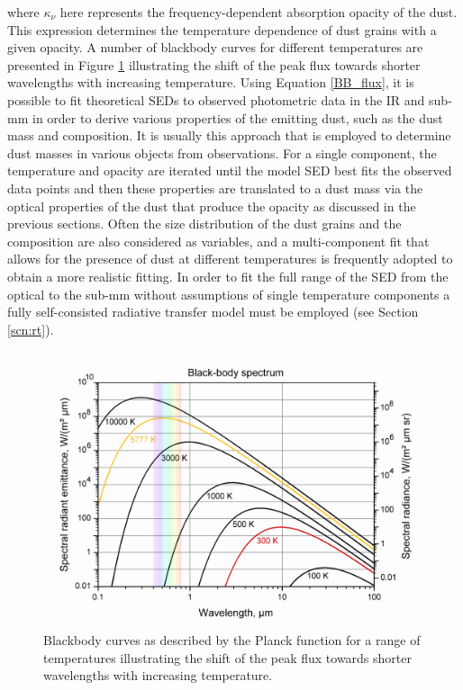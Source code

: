 \noindent where $\kappa_{\nu}$ here represents the frequency-dependent absorption opacity of the dust.  This expression determines the temperature dependence of dust grains with a given opacity.  A number of blackbody curves for different temperatures are presented in Figure \ref{BB} illustrating the shift of the peak flux towards shorter wavelengths with increasing temperature.  Using Equation \ref{BB_flux}, it is possible to fit theoretical SEDs to  observed photometric data in the IR and sub-mm in order to derive various properties of the emitting dust, such as the dust mass and composition.  It is usually this approach that is employed to determine dust masses in various objects from observations.  For a single component, the temperature and opacity are iterated until the model SED best fits the observed data points and then these properties are translated to a dust mass via the optical properties of the dust that produce the opacity as discussed in the previous sections.  Often the size distribution of the dust grains and the composition are also considered as variables, and a multi-component fit that allows for the presence of dust at different temperatures is frequently adopted to obtain a  more realistic fitting.  In order to fit  the full range of the SED from the optical to the sub-mm without assumptions of single temperature components  a fully self-consisted radiative transfer model must be employed (see Section \ref{scn:rt}).

\begin{figure}
\centering
\includegraphics[clip=true,scale=0.5,trim= 30 20 20 20]{chapters/chapter1/figs/BB_curves4.png}
\caption{Blackbody curves as described by the Planck function for a range of temperatures illustrating the shift of the peak flux towards shorter wavelengths with increasing temperature.}
\label{BB}
\end{figure}


